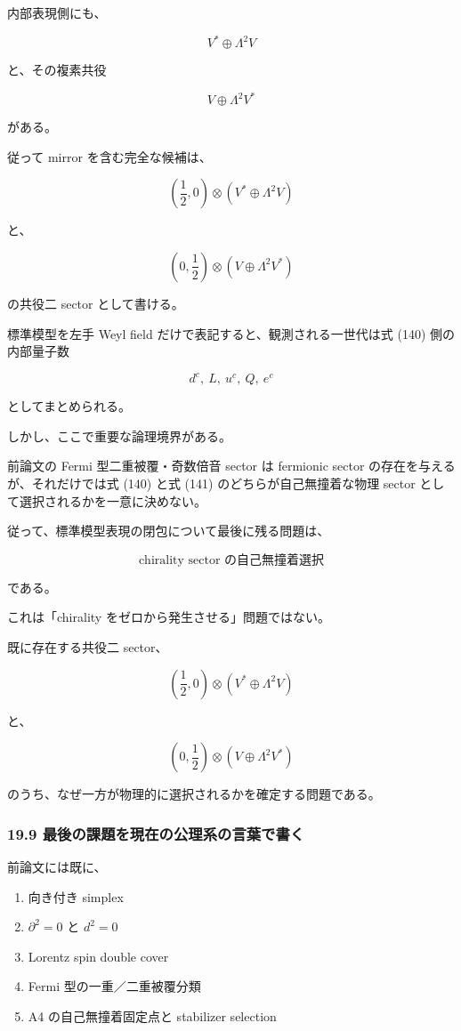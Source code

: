 \documentclass[
  a4paper,
]{ltjsarticle}
\providecommand{\tightlist}{%
  \setlength{\itemsep}{0pt}\setlength{\parskip}{0pt}}
\begin{document}
内部表現側にも、

\[
\boxed{
V^*\oplus\Lambda^2V
}
\tag{138}
\]

と、その複素共役

\[
\boxed{
V\oplus\Lambda^2V^*
}
\tag{139}
\]

がある。

従って mirror を含む完全な候補は、

\[
\boxed{
\left(\frac12,0\right)
\otimes
\left(
V^*\oplus\Lambda^2V
\right)
}
\tag{140}
\]

と、

\[
\boxed{
\left(0,\frac12\right)
\otimes
\left(
V\oplus\Lambda^2V^*
\right)
}
\tag{141}
\]

の共役二 sector として書ける。

標準模型を左手 Weyl field だけで表記すると、観測される一世代は式 (140)
側の内部量子数

\[
d^c,\ L,\ u^c,\ Q,\ e^c
\]

としてまとめられる。

しかし、ここで重要な論理境界がある。

前論文の Fermi 型二重被覆・奇数倍音 sector は fermionic sector
の存在を与えるが、それだけでは式 (140) と式 (141)
のどちらが自己無撞着な物理 sector として選択されるかを一意に決めない。

従って、標準模型表現の閉包について最後に残る問題は、

\[
\boxed{
\text{chirality sector の自己無撞着選択}
}
\tag{142}
\]

である。

これは「chirality をゼロから発生させる」問題ではない。

既に存在する共役二 sector、

\[
\left(\frac12,0\right)
\otimes
(V^*\oplus\Lambda^2V)
\]

と、

\[
\left(0,\frac12\right)
\otimes
(V\oplus\Lambda^2V^*)
\]

のうち、なぜ一方が物理的に選択されるかを確定する問題である。

\subsubsection{19.9
最後の課題を現在の公理系の言葉で書く}\label{ux6700ux5f8cux306eux8ab2ux984cux3092ux73feux5728ux306eux516cux7406ux7cfbux306eux8a00ux8449ux3067ux66f8ux304f}

前論文には既に、

\begin{enumerate}
\def\labelenumi{\arabic{enumi}.}
\tightlist
\item
  向き付き simplex
\item
  \(\partial^2=0\) と \(d^2=0\)
\item
  Lorentz spin double cover
\item
  Fermi 型の一重／二重被覆分類
\item
  A4 の自己無撞着固定点と stabilizer selection
\end{enumerate}
\end{document}
